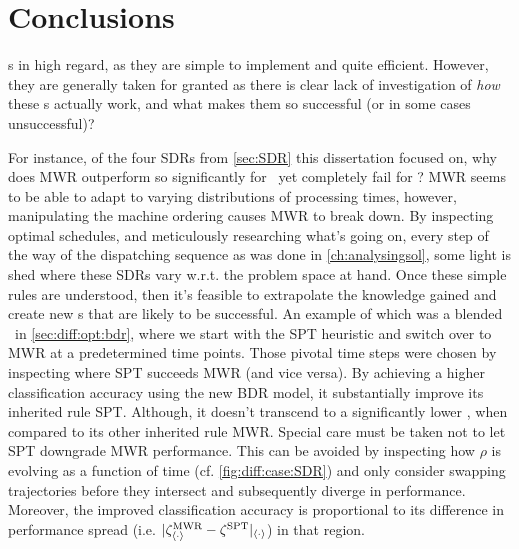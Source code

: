 
\chapter{Conclusions}\label{ch:conclusions} 
 \sdr s in high regard, as they 
are simple to implement and quite efficient. 
However, they are generally taken for granted as there is clear lack of 
investigation of \emph{how} these \dr s actually work, and what 
makes them so successful (or in some cases unsuccessful)? 

For instance, of the four SDRs from \cref{sec:SDR} this dissertation focused 
on, why does MWR outperform so significantly for \jsp\, yet completely fail for 
\fsp? 
MWR seems to be able to adapt to varying distributions of processing times, 
however, manipulating the machine ordering causes MWR to break down. 
By inspecting optimal schedules, and meticulously researching what's going on, 
every step of the way of the dispatching sequence as was done in 
\cref{ch:analysingsol}, some light is shed where these SDRs vary w.r.t. the 
problem space at hand. 
Once these simple rules are understood, then it's feasible to extrapolate the 
knowledge gained and create new \cdr s that are likely to be successful. 
An example of which was a blended \dr\ in \cref{sec:diff:opt:bdr}, where we 
start with the SPT heuristic and switch over to MWR at a predetermined time 
points. Those pivotal time steps were chosen by inspecting where SPT succeeds 
MWR (and vice versa). 
By achieving a higher classification accuracy using the new BDR model, it 
substantially improve its inherited rule SPT.
Although, it doesn't transcend to a significantly lower \namerho, when compared 
to its other inherited rule MWR. 
Special care must be taken not to let SPT downgrade MWR performance. This can 
be avoided by inspecting how $\rho$ is evolving as a function of time (cf. 
\cref{fig:diff:case:SDR}) and only consider swapping trajectories before they 
intersect and subsequently diverge in performance. 
Moreover, the improved classification accuracy is proportional to its 
difference in performance spread (i.e. 
$\lvert\zeta^{\text{MWR}}_{\langle\cdot\rangle} - 
\zeta^{\text{SPT}}\rvert_{\langle\cdot\rangle}$) in that region.

